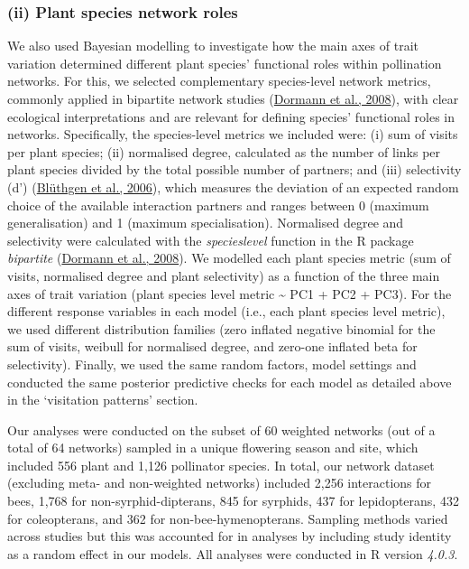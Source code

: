 \documentclass[
  12pt,
  a4paper,
]{article}
\begin{document}
\hypertarget{ii-plant-species-network-roles}{%
\subsubsection{(ii) Plant species network roles}\label{ii-plant-species-network-roles}}

We also used Bayesian modelling to investigate how the main axes of trait variation determined different plant species' functional roles within pollination networks. For this, we selected complementary species-level network metrics, commonly applied in bipartite network studies (\protect\hyperlink{ref-dormann2008}{Dormann et al., 2008}), with clear ecological interpretations and are relevant for defining species' functional roles in networks. Specifically, the species-level metrics we included were: (i) sum of visits per plant species; (ii) normalised degree, calculated as the number of links per plant species divided by the total possible number of partners; and (iii) selectivity (d') (\protect\hyperlink{ref-bluthgen2006}{Blüthgen et al., 2006}), which measures the deviation of an expected random choice of the available interaction partners and ranges between 0 (maximum generalisation) and 1 (maximum specialisation). Normalised degree and selectivity were calculated with the \emph{specieslevel} function in the R package \emph{bipartite} (\protect\hyperlink{ref-dormann2008}{Dormann et al., 2008}). We modelled each plant species metric (sum of visits, normalised degree and plant selectivity) as a function of the three main axes of trait variation (plant species level metric \textasciitilde{} PC1 + PC2 + PC3). For the different response variables in each model (i.e., each plant species level metric), we used different distribution families (zero inflated negative binomial for the sum of visits, weibull for normalised degree, and zero-one inflated beta for selectivity). Finally, we used the same random factors, model settings and conducted the same posterior predictive checks for each model as detailed above in the `visitation patterns' section.

Our analyses were conducted on the subset of 60 weighted networks (out of a total of 64 networks) sampled in a unique flowering season and site, which included 556 plant and 1,126 pollinator species. In total, our network dataset (excluding meta- and non-weighted networks) included 2,256 interactions for bees, 1,768 for non-syrphid-dipterans, 845 for syrphids, 437 for lepidopterans, 432 for coleopterans, and 362 for non-bee-hymenopterans. Sampling methods varied across studies but this was accounted for in analyses by including study identity as a random effect in our models. All analyses were conducted in R version \emph{4.0.3}.
\end{document}
